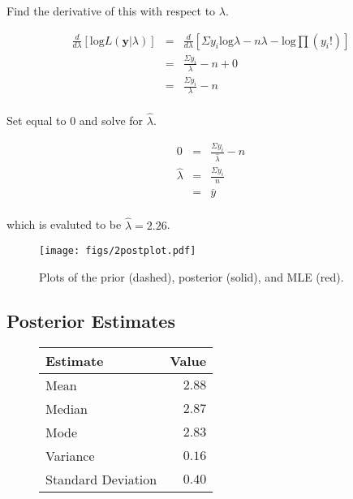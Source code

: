 \documentclass[12pt]{article}
\newcommand{\ybar}{\overline{y}}
\begin{document}
\noindent Find the derivative of this with respect to $\lambda$.

\begin{eqnarray*}
\frac{d}{d\lambda}\left[\mathrm{log}L(\mathbf{y}|\lambda)\right] &=& \frac{d}{d\lambda}\left[\Sigma y_i\mathrm{log}\lambda-n\lambda-\mathrm{log}\prod (y_i!)\right] \\
&=& \frac{\Sigma y_i}{\lambda}-n+0 \\
&=& \frac{\Sigma y_i}{\lambda}-n \\
\end{eqnarray*}

\noindent Set equal to 0 and solve for $\hat{\lambda}$.

\begin{eqnarray*}
0 &=& \frac{\Sigma y_i}{\hat{\lambda}}-n \\
\hat{\lambda} &=& \frac{\Sigma y_i}{n} \\
&=& \ybar \\
\end{eqnarray*}

\noindent which is evaluted to be $\hat{\lambda}=2.26$.

\begin{figure}[H]
\begin{center}
\texttt{[image: figs/2postplot.pdf]}
\caption{Plots of the prior (dashed), posterior (solid), and MLE (red).}
\end{center}
\end{figure}

\subsection{Posterior Estimates}

\begin{figure}[H]
\begin{center}
\begin{tabular}{l|r}
Estimate & \multicolumn{1}{l}{Value} \\ \hline \hline
Mean               & $2.88$ \\
Median             & $2.87$ \\
Mode               & $2.83$ \\
Variance           & $0.16$ \\
Standard Deviation & $0.40$ \\
\end{tabular}
\end{center}
\end{figure}
\end{document}

